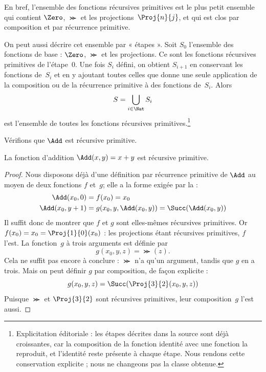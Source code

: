 \documentclass[../../../include/open-logic-section]{subfiles}
\begin{document}
\begin{explain}
En bref, l'ensemble des fonctions récursives primitives est le
plus petit ensemble qui contient $\Zero$, $\Succ$ et les
projections~$\Proj{n}{j}$, et qui est clos par composition et
par récurrence primitive.

On peut aussi décrire cet ensemble par « étapes ». Soit $S_0$
l'ensemble des fonctions de base : $\Zero$, $\Succ$ et les
projections. Ce sont les fonctions récursives primitives de
l'étape~$0$. Une fois $S_i$ défini, on obtient $S_{i+1}$ en
conservant les fonctions de~$S_i$ et en y ajoutant toutes celles
que donne une seule application de la composition ou de la
récurrence primitive à des fonctions de~$S_i$. Alors
\[
S = \bigcup_{i \in \Nat} S_i
\]
est l'ensemble de toutes les fonctions récursives primitives.\footnote{Explicitation éditoriale : les étapes décrites dans la source sont déjà croissantes, car la composition de la fonction identité avec une fonction la reproduit, et l'identité reste présente à chaque étape. Nous rendons cette conservation explicite ; nous ne changeons pas la classe obtenue.}
\end{explain}

Vérifions que $\Add$ est récursive primitive.

\begin{prop}
  La fonction d'addition $\Add(x,y)=x+y$ est récursive primitive.
\end{prop}

\begin{proof}
Nous disposons déjà d'une définition par récurrence primitive
de $\Add$ au moyen de deux fonctions $f$ et~$g$; elle a la
forme exigée par la  :
\begin{align*}
  \Add(x_0, 0) & = f(x_0) = x_0\\
  \Add(x_0, y+1) & = g(x_0, y, \Add(x_0, y)) =
  \Succ(\Add(x_0, y))
\end{align*}
Il suffit donc de montrer que $f$ et $g$ sont elles-mêmes
récursives primitives. Or $f(x_0)=x_0=\Proj{1}{0}(x_0)$ :
les projections étant récursives primitives, $f$ l'est.
La fonction~$g$ à trois arguments est définie par
\[
g(x_0, y, z) = \Succ(z).
\]
Cela ne suffit pas encore à conclure : $\Succ$ n'a qu'un
argument, tandis que $g$ en a trois. Mais on peut définir
$g$ par composition, de façon explicite :
\[
g(x_0, y, z) = \Succ(\Proj{3}{2}(x_0, y, z))
\]
Puisque $\Succ$ et $\Proj{3}{2}$ sont récursives primitives,
leur composition~$g$ l'est aussi.
\end{proof}
\end{document}
